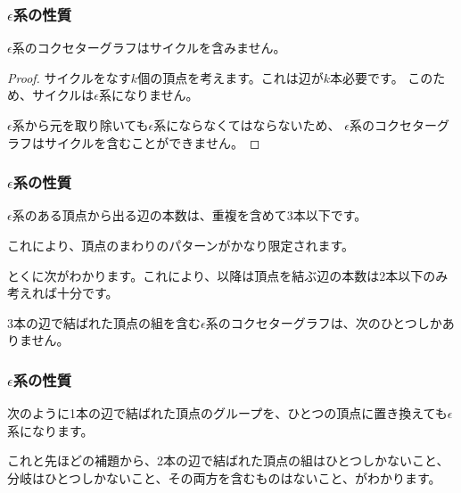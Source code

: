 \documentclass{beamer}
\begin{document}
\begin{frame}
    \frametitle{$ϵ$系の性質}

    \begin{lemma}
        $ϵ$系のコクセターグラフはサイクルを含みません。
    \end{lemma}

    \begin{figure}
        \centering
    \end{figure}

    \begin{proof}
        サイクルをなす$k$個の頂点を考えます。これは辺が$k$本必要です。
        このため、サイクルは$ϵ$系になりません。

        $ϵ$系から元を取り除いても$ϵ$系にならなくてはならないため、
        $ϵ$系のコクセターグラフはサイクルを含むことができません。
    \end{proof}
\end{frame}

\begin{frame}
    \frametitle{$ϵ$系の性質}

    \begin{lemma}
        $ϵ$系のある頂点から出る辺の本数は、重複を含めて$3$本以下です。
    \end{lemma}

    これにより、頂点のまわりのパターンがかなり限定されます。

    とくに次がわかります。これにより、以降は頂点を結ぶ辺の本数は$2$本以下のみ考えれば十分です。

    \begin{lemma}
        3本の辺で結ばれた頂点の組を含む$ϵ$系のコクセターグラフは、次のひとつしかありません。
        \begin{figure}
            \centering
        \end{figure}
    \end{lemma}
\end{frame}

\begin{frame}
    \frametitle{$ϵ$系の性質}

    \begin{lemma}
        次のように1本の辺で結ばれた頂点のグループを、ひとつの頂点に置き換えても$ϵ$系になります。
        \begin{figure}
            \centering
        \end{figure}
    \end{lemma}

    これと先ほどの補題から、2本の辺で結ばれた頂点の組はひとつしかないこと、分岐はひとつしかないこと、その両方を含むものはないこと、がわかります。
\end{frame}
\end{document}
